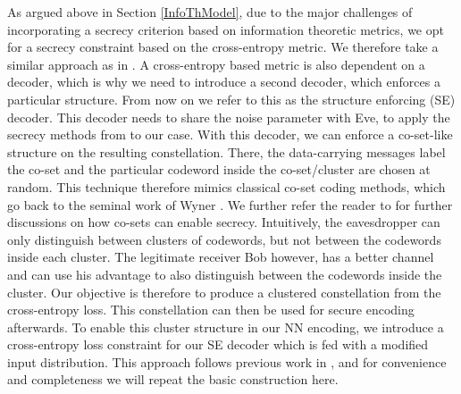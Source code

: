 \documentclass[conference, 10pt]{IEEEtran}
\begin{document}
As argued above in Section \ref{InfoThModel}, due to the major challenges of incorporating a secrecy criterion based on information theoretic metrics, we opt for a secrecy constraint based on the cross-entropy metric. We therefore take a similar approach as in \cite{ICC_DL_Sec}. A cross-entropy based metric is also dependent on a decoder, which is why we need to introduce a second decoder, which enforces a particular structure. From now on we refer to this as the structure enforcing (SE) decoder. This decoder needs to share the noise parameter with Eve, to apply the secrecy methods from \cite{ICC_DL_Sec} to our case. With this decoder, we can enforce a co-set-like structure on the resulting constellation. There, the data-carrying messages label the co-set and the particular codeword inside the co-set/cluster are chosen at random. This technique therefore mimics classical co-set coding methods, which go back to the seminal work of Wyner \cite{Wyner75}. We further refer the reader to \cite[Appendix A]{Oggier16} for further discussions on how co-sets can enable secrecy. Intuitively, the eavesdropper can only distinguish between clusters of codewords, but not between the codewords inside each cluster. The legitimate receiver Bob however, has a better channel and can use his advantage to also distinguish between the codewords inside the cluster. Our objective is therefore to produce a clustered constellation from the cross-entropy loss. This constellation can then be used for secure encoding afterwards. To enable this cluster structure in our NN encoding, we introduce a cross-entropy loss constraint for our SE decoder which is fed with a modified input distribution. This approach follows previous work in \cite{ICC_DL_Sec}, and for convenience and completeness we will repeat the basic construction here.
\end{document}
